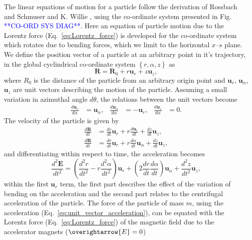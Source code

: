 \documentclass[../main.tex]{subfiles}
\begin{document}
The linear equations of motion for a particle follow the derivation of Rossbach and Schmuser \cite{rossbach1993basic} and K. Willie \cite{wille2000physics}, using the co-ordinate system presented in Fig. \textcolor{blue}{**CO-ORD SYS DIAG**}. Here an equation of particle motion due to the Lorentz force (Eq.~\ref{eq:Lorentz_force}) is developed for the co-ordinate system which rotates due to bending forces, which we limit to the horizontal $x$--$s$ plane. We define the position vector of a particle at an arbitrary point in it's trajectory, in the global cyclindrical co-ordinate system $\left\{r,\alpha,z\right\}$ as
\begin{equation}
\boldsymbol{R} = \boldsymbol{R}_{0} + r\boldsymbol{u}_{r} + z\boldsymbol{u}_{z},    
\label{eq:particle_position_vector}
\end{equation}
where $R_{0}$ is the distance of the particle from an arbitrary origin point and $\boldsymbol{u}_{r}$, $\boldsymbol{u}_{\alpha}$, $\boldsymbol{u}_{z}$ are unit vectors describing the motion of the particle. Assuming a small variation in azimuthal angle $d\theta$, the relations between the unit vectors become
\begin{align}
\frac{d\boldsymbol{u}_{r}}{d\alpha} &= \boldsymbol{u}_{\alpha}, & \frac{d\boldsymbol{u}_{\alpha}}{d\alpha} &= -\boldsymbol{u}_{r}, & \frac{d\boldsymbol{u}_{z}}{d\alpha} &= 0.
\label{eq:unit_vector_angular_derivatives}    
\end{align}
The velocity of the particle is given by
\begin{align}
\frac{d\boldsymbol{R}}{dt} &= \frac{dr}{dt}\boldsymbol{u}_{r}+r\frac{d\boldsymbol{u}_{r}}{dt} +\frac{dz}{dt}\boldsymbol{u}_{z}, \nonumber \\
\frac{d\boldsymbol{R}}{dt} &= \frac{dr}{dt}\boldsymbol{u}_{r} + r\frac{d\alpha}{dt}\boldsymbol{u}_{\alpha} + \frac{dz}{dt}\boldsymbol{u}_{z},
\label{eq:unit_vector_velocity}    
\end{align}
and differentiating within respect to time, the acceleration becomes
\begin{equation}
\frac{d^{2}\boldsymbol{E}}{dt^{2}} = \left(\frac{d^{2}r}{dt^{2}}-r\frac{d^{2}\alpha}{dt^{2}}\right)\boldsymbol{u}_{r} + \left(2\frac{dr}{dt}\frac{d\alpha}{dt}\right)\boldsymbol{u}_{\alpha} + \frac{d^{2}z}{dt^{2}}\boldsymbol{u}_{z},
\label{eq:unit_vector_acceleration}    
\end{equation}
within the first $\boldsymbol{u}_{r}$ term, the first part describes the effect of the variation of bending on the acceleration and the second part relates to the centrifugal acceleration of the particle. The force of the particle of mass $m$, using the acceleration (Eq.~\ref{eq:unit_vector_acceleration}), can be equated with the Lorentz force (Eq.~\ref{eq:Lorentz_force}) of the magnetic field due to the accelerator magnets ($\overightarrow{E}=0$)
\end{document}
